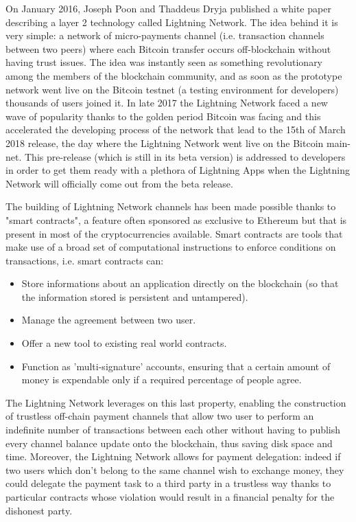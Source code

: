		On January 2016, Joseph Poon and Thaddeus Dryja published a white paper describing a layer 2 technology called Lightning Network\cite{Poon2016}. The idea behind it is very simple: a network of micro-payments channel (i.e. transaction channels between two peers) where each Bitcoin transfer occurs off-blockchain without having trust issues. The idea was instantly seen as something revolutionary among the members of the blockchain community, and as soon as the prototype network went live on the Bitcoin testnet (a testing environment for developers) thousands of users joined it. In late 2017 the Lightning Network faced a new wave of popularity thanks to the golden period Bitcoin was facing and this accelerated the developing process of the network that lead to the 15th of March 2018 release, the day where the Lightning Network went live on the Bitcoin main-net. This pre-release (which is still in its beta version) is addressed to developers in order to get them ready with a plethora of Lightning Apps when the Lightning Network will officially come out from the beta release.
		
		The building of Lightning Network channels has been made possible thanks to "smart contracts", a feature often sponsored as exclusive to Ethereum\cite{Buterin2014} but that is present in most of the cryptocurrencies available. Smart contracts are tools that make use of a broad set of computational instructions to enforce conditions on transactions, i.e. smart contracts can:
		\begin{itemize}
			\item Store informations about an application directly on the blockchain (so that the information stored is persistent and untampered).
			\item Manage the agreement between two user.
			\item Offer a new tool to existing real world contracts.
			\item Function as 'multi-signature' accounts, ensuring that a certain amount of money is expendable only if a required percentage of people agree.
		\end{itemize}
	
		The Lightning Network leverages on this last property, enabling the construction of trustless off-chain payment channels that allow two user to perform an indefinite number of transactions between each other without having to publish every channel balance update onto the blockchain, thus saving disk space and time. Moreover, the Lightning Network allows for payment delegation: indeed if two users which don't belong to the same channel wish to exchange money, they could delegate the payment task to a third party in a trustless way thanks to particular contracts whose violation would result in a financial penalty for the dishonest party.

